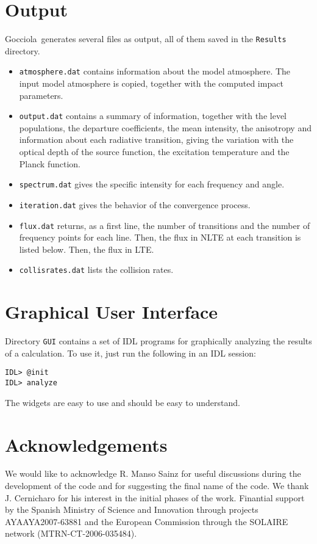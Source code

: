 \documentclass[12pt]{article}
\def\G{Gocciola}
\begin{document}
\section{Output}
\G\ generates several files as output, all of them saved in the \texttt{Results} directory.
\begin{itemize}
\item \texttt{atmosphere.dat} contains information about the model atmosphere. The input
model atmosphere is copied, together with the computed impact parameters.
\item \texttt{output.dat} contains a summary of information, together with the
level populations, the departure coefficients, the mean intensity, the anisotropy and
information about each radiative transition, giving the variation with the optical
depth of the source function, the excitation temperature and the Planck function.
\item \texttt{spectrum.dat} gives the specific intensity for each frequency and angle.
\item \texttt{iteration.dat} gives the behavior of the convergence process.
\item \texttt{flux.dat} returns, as a first line, the number of transitions and the
number of frequency points for each line. Then, the flux in NLTE at each transition is listed
below. Then, the flux in LTE.
\item \texttt{collisrates.dat} lists the collision rates.
\end{itemize}


\section{Graphical User Interface}
Directory \texttt{GUI} contains a set of IDL programs for graphically
analyzing the results of a calculation. To use it, just run the
following in an IDL session:
\begin{verbatim}
IDL> @init
IDL> analyze
\end{verbatim}
The widgets are easy to use and should be easy to understand.

\newpage
\section*{Acknowledgements}
We would like to acknowledge R. Manso Sainz for useful discussions during the development
of the code and for suggesting the final name of the code. We thank
J. Cernicharo for his interest in the initial phases of the work. Finantial support
by the Spanish Ministry of Science and Innovation through projects AYAAYA2007-63881 and the European
Commission through the SOLAIRE network (MTRN-CT-2006-035484).



\end{document}
